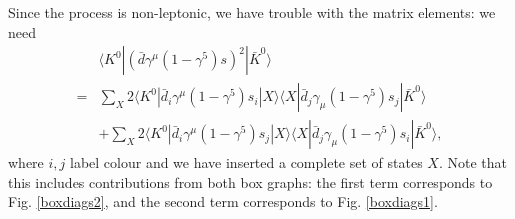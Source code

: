 Since the process is non-leptonic, we have trouble with the matrix elements: we need
\begin{equation}
\begin{split}
&\langle K^0 | (\bar{d}\gamma^\mu (1-\gamma^5)s)^2| \bar{K}^0 \rangle \\
= &\sum_X 2 \langle K^0 | \bar{d}_i \gamma^\mu (1-\gamma^5) s_i | X \rangle \langle X| \bar{d}_j \gamma_\mu (1-\gamma^5) s_j | \bar{K}^0 \rangle \\
&+\sum_X 2 \langle K^0 | \bar{d}_i \gamma^\mu (1-\gamma^5) s_j | X \rangle \langle X| \bar{d}_j \gamma_\mu (1-\gamma^5) s_i | \bar{K}^0 \rangle,
\end{split}
\end{equation}
where $i,j$ label colour and we have inserted a complete set of states $X$. Note that this includes contributions from both box graphs: the first term corresponds to Fig. \ref{boxdiags2}, and the second term corresponds to Fig. \ref{boxdiags1}.

